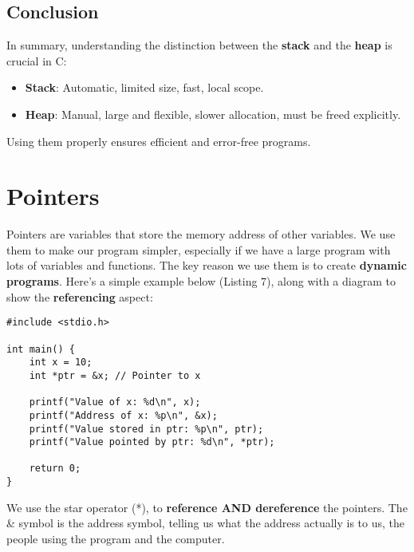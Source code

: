 \documentclass[a4paper,12pt]{article}
\begin{document}
\subsection{Conclusion}
In summary, understanding the distinction between the \textbf{stack} and the \textbf{heap} is crucial in C:
\begin{itemize}
  \item \textbf{Stack}: Automatic, limited size, fast, local scope.
  \item \textbf{Heap}: Manual, large and flexible, slower allocation, must be freed explicitly.
\end{itemize}
Using them properly ensures efficient and error-free programs.

\hrulefill

\newpage

\section{\huge{Pointers}}

Pointers are variables that store the memory address of other variables. We use them to make our program simpler, especially if we have a large program with lots of variables and functions. The key reason we use them is to create \textbf{dynamic programs}. Here's a simple example below (Listing 7), along with a diagram to show the \textbf{referencing} aspect:

\lstset{language=C}
\begin{lstlisting}[caption=Referencing with pointers and addresses]
#include <stdio.h>

int main() {
    int x = 10;
    int *ptr = &x; // Pointer to x

    printf("Value of x: %d\n", x);
    printf("Address of x: %p\n", &x);
    printf("Value stored in ptr: %p\n", ptr);
    printf("Value pointed by ptr: %d\n", *ptr);

    return 0;
}

\end{lstlisting}

We use the star operator (*), to \textbf{reference AND dereference} the pointers. The \& symbol is the address symbol, telling us what the address actually is to us, the people using the program and the computer. 
\end{document}
